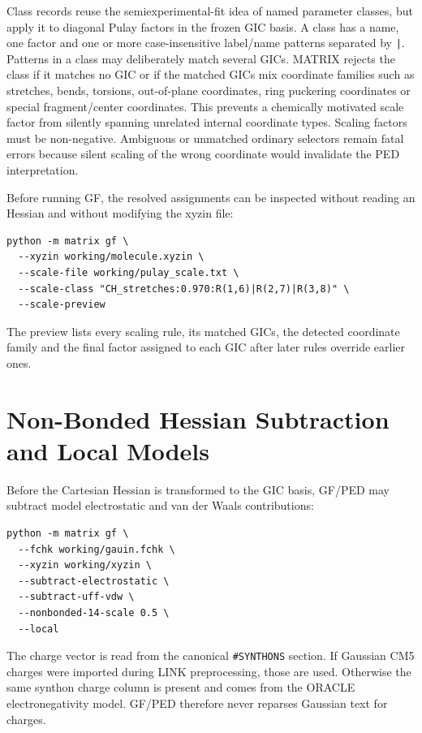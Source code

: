 \documentclass[11pt]{article}
\begin{document}
\noindent
Class records reuse the semiexperimental-fit idea of named parameter classes,
but apply it to diagonal Pulay factors in the frozen GIC basis.  A class has a
name, one factor and one or more case-insensitive label/name patterns separated
by \texttt{|}.  Patterns in a class may deliberately match several GICs.  MATRIX
rejects the class if it matches no GIC or if the matched GICs mix coordinate
families such as stretches, bends, torsions, out-of-plane coordinates, ring
puckering coordinates or special fragment/center coordinates.  This prevents a
chemically motivated scale factor from silently spanning unrelated internal
coordinate types.  Scaling factors must be non-negative.  Ambiguous or
unmatched ordinary selectors remain fatal errors because silent scaling of the
wrong coordinate would invalidate the PED interpretation.

\noindent
Before running GF, the resolved assignments can be inspected without reading an
Hessian and without modifying the xyzin file:

\begin{lstlisting}[style=oracle]
python -m matrix gf \
  --xyzin working/molecule.xyzin \
  --scale-file working/pulay_scale.txt \
  --scale-class "CH_stretches:0.970:R(1,6)|R(2,7)|R(3,8)" \
  --scale-preview
\end{lstlisting}

\noindent
The preview lists every scaling rule, its matched GICs, the detected coordinate
family and the final factor assigned to each GIC after later rules override
earlier ones.

\section{Non-Bonded Hessian Subtraction and Local Models}

Before the Cartesian Hessian is transformed to the GIC basis, GF/PED may
subtract model electrostatic and van der Waals contributions:

\begin{lstlisting}[style=oracle]
python -m matrix gf \
  --fchk working/gauin.fchk \
  --xyzin working/xyzin \
  --subtract-electrostatic \
  --subtract-uff-vdw \
  --nonbonded-14-scale 0.5 \
  --local
\end{lstlisting}

\noindent
The charge vector is read from the canonical \texttt{\#SYNTHONS} section.  If
Gaussian CM5 charges were imported during LINK preprocessing, those are
used.  Otherwise the same synthon charge column is present and comes from the
ORACLE electronegativity model.  GF/PED therefore never reparses Gaussian text
for charges.
\end{document}
